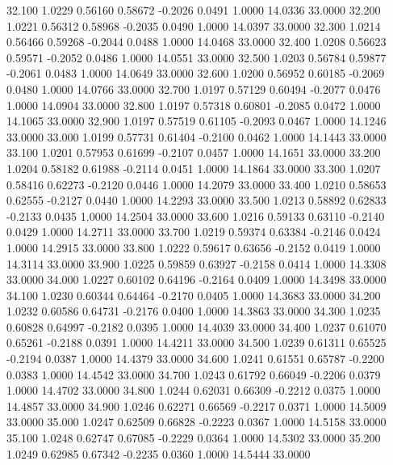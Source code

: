   32.100   1.0229   0.56160   0.58672  -0.2026   0.0491   1.0000  14.0336  33.0000
  32.200   1.0221   0.56312   0.58968  -0.2035   0.0490   1.0000  14.0397  33.0000
  32.300   1.0214   0.56466   0.59268  -0.2044   0.0488   1.0000  14.0468  33.0000
  32.400   1.0208   0.56623   0.59571  -0.2052   0.0486   1.0000  14.0551  33.0000
  32.500   1.0203   0.56784   0.59877  -0.2061   0.0483   1.0000  14.0649  33.0000
  32.600   1.0200   0.56952   0.60185  -0.2069   0.0480   1.0000  14.0766  33.0000
  32.700   1.0197   0.57129   0.60494  -0.2077   0.0476   1.0000  14.0904  33.0000
  32.800   1.0197   0.57318   0.60801  -0.2085   0.0472   1.0000  14.1065  33.0000
  32.900   1.0197   0.57519   0.61105  -0.2093   0.0467   1.0000  14.1246  33.0000
  33.000   1.0199   0.57731   0.61404  -0.2100   0.0462   1.0000  14.1443  33.0000
  33.100   1.0201   0.57953   0.61699  -0.2107   0.0457   1.0000  14.1651  33.0000
  33.200   1.0204   0.58182   0.61988  -0.2114   0.0451   1.0000  14.1864  33.0000
  33.300   1.0207   0.58416   0.62273  -0.2120   0.0446   1.0000  14.2079  33.0000
  33.400   1.0210   0.58653   0.62555  -0.2127   0.0440   1.0000  14.2293  33.0000
  33.500   1.0213   0.58892   0.62833  -0.2133   0.0435   1.0000  14.2504  33.0000
  33.600   1.0216   0.59133   0.63110  -0.2140   0.0429   1.0000  14.2711  33.0000
  33.700   1.0219   0.59374   0.63384  -0.2146   0.0424   1.0000  14.2915  33.0000
  33.800   1.0222   0.59617   0.63656  -0.2152   0.0419   1.0000  14.3114  33.0000
  33.900   1.0225   0.59859   0.63927  -0.2158   0.0414   1.0000  14.3308  33.0000
  34.000   1.0227   0.60102   0.64196  -0.2164   0.0409   1.0000  14.3498  33.0000
  34.100   1.0230   0.60344   0.64464  -0.2170   0.0405   1.0000  14.3683  33.0000
  34.200   1.0232   0.60586   0.64731  -0.2176   0.0400   1.0000  14.3863  33.0000
  34.300   1.0235   0.60828   0.64997  -0.2182   0.0395   1.0000  14.4039  33.0000
  34.400   1.0237   0.61070   0.65261  -0.2188   0.0391   1.0000  14.4211  33.0000
  34.500   1.0239   0.61311   0.65525  -0.2194   0.0387   1.0000  14.4379  33.0000
  34.600   1.0241   0.61551   0.65787  -0.2200   0.0383   1.0000  14.4542  33.0000
  34.700   1.0243   0.61792   0.66049  -0.2206   0.0379   1.0000  14.4702  33.0000
  34.800   1.0244   0.62031   0.66309  -0.2212   0.0375   1.0000  14.4857  33.0000
  34.900   1.0246   0.62271   0.66569  -0.2217   0.0371   1.0000  14.5009  33.0000
  35.000   1.0247   0.62509   0.66828  -0.2223   0.0367   1.0000  14.5158  33.0000
  35.100   1.0248   0.62747   0.67085  -0.2229   0.0364   1.0000  14.5302  33.0000
  35.200   1.0249   0.62985   0.67342  -0.2235   0.0360   1.0000  14.5444  33.0000

